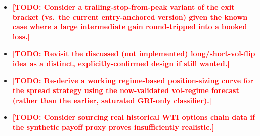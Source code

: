 \documentclass[11pt]{article}
\newcommand{\todo}[1]{\textcolor{red}{\textbf{[TODO: #1]}}}
\begin{document}
\begin{itemize}
{  attach a payoff model (variance-swap proxy or simplified Black-Scholes
  straddle) to convert the timing result into an actual P\&L backtest.}
  \item \todo{Consider a trailing-stop-from-peak variant of the exit
  bracket (vs.\ the current entry-anchored version) given the known case
  where a large intermediate gain round-tripped into a booked loss.}
  \item \todo{Revisit the discussed (not implemented) long/short-vol-flip
  idea as a distinct, explicitly-confirmed design if still wanted.}
  \item \todo{Re-derive a working regime-based position-sizing curve for
  the spread strategy using the now-validated vol-regime forecast (rather
  than the earlier, saturated GRI-only classifier).}
  \item \todo{Consider sourcing real historical WTI options chain data if
  the synthetic payoff proxy proves insufficiently realistic.}
\end{itemize}
\end{document}
